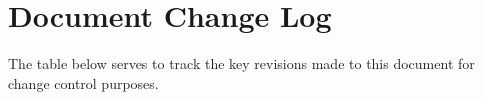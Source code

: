 \documentclass[11pt]{article}
\begin{document}
  \newpage







  \section{Document Change Log}\label{app:changelog}

    The table below serves to track the key revisions made to this document for
    change control purposes.
\end{document}
